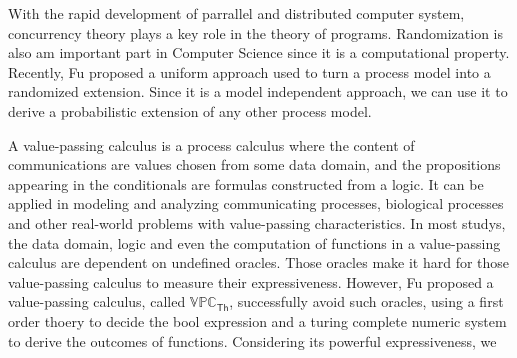 
\begin{bigabstract}
  With the rapid development of parrallel and distributed computer system,
  concurrency theory plays a key role in the theory of programs.
  Randomization is also am important part in Computer Science since it is a computational property. 
  Recently, Fu proposed a uniform approach
  used to turn a process model into a randomized extension.
  Since it is a model independent approach,
  we can use it to derive a probabilistic extension of 
  any other process model.

  A value-passing calculus is a process calculus where the content of communications are values chosen from some data domain,
  and the propositions appearing in the conditionals are formulas constructed from a logic.
  It can be applied in modeling and analyzing communicating processes,
  biological processes and other real-world problems with value-passing characteristics.
  In most studys, the data domain, logic and even the computation of functions in a value-passing calculus are dependent on undefined oracles.
  Those oracles make it hard for those value-passing calculus to measure their expressiveness.
  However,
  Fu proposed a value-passing calculus, called $\mathbb{VPC}_{\mathsf{Th}}$, successfully avoid such oracles, 
  using a first order thoery to decide the bool expression and a turing complete numeric system to derive the outcomes of functions.
  Considering its powerful expressiveness,
  we 

\end{bigabstract}

